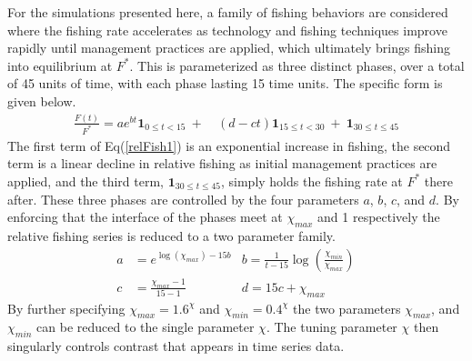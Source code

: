 \documentclass[12pt]{article}
\begin{document}
%
For the simulations presented here, a family of fishing behaviors are 
considered where the fishing rate accelerates as technology and fishing 
techniques improve rapidly until management practices are applied, which 
ultimately brings fishing into equilibrium at $F^*$. %
This is parameterized as three distinct phases, over a total of 45 units of 
time, with each phase lasting 15 time units. The specific form is given below. %
\begin{align}
	\frac{F(t)}{F^*} = a e^{b t}\bm{1}_{0\le t<15} ~+~&(d-c t)\bm{1}_{15\le t<30} ~+~ \bm{1}_{30\le t \le 45} \label{relFish1} %
\end{align}
%
The first term of Eq(\ref{relFish1}) is an exponential increase in fishing, 
the second term is a linear decline in relative fishing as initial management 
practices are applied, and the third term, $\bm{1}_{30\le t \le 45}$, simply 
holds the fishing rate at $F^*$ there after. These three phases are 
controlled by the four parameters $a$, $b$, $c$, and $d$. By enforcing that 
the interface of the phases meet at $\chi_{max}$ and 1 respectively
the relative fishing series is reduced to a two parameter family. %
%
\begin{align}
        a &= e^{\log(\chi_{max})-15b} 	&b = \frac{1}{t-15}\log\left(\frac{\chi_{min}}{\chi_{max}}\right) \label{relFish2} \\ %
        c &= \frac{\chi_{max}-1}{15-1}  &d = 15c + \chi_{max} ~~~~~~~~~~~ \label{relFish3}
\end{align}
%
By further specifying $\chi_{max} = 1.6^\chi$ and $\chi_{min} = 0.4^\chi$
the two parameters $\chi_{max}$, and $\chi_{min}$ can be reduced to the single 
parameter $\chi$. The tuning parameter $\chi$ then singularly controls contrast 
that appears in time series data.
\end{document}
